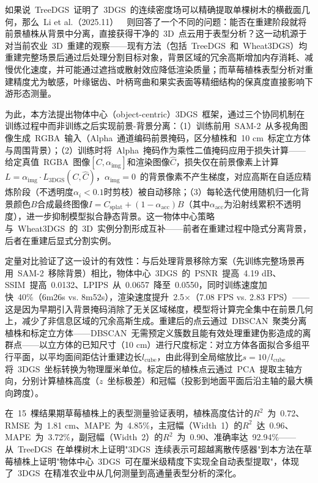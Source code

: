 如果说~TreeDGS~证明了~3DGS~的连续密度场可以精确提取单棵树木的横截面几何，那么~Li et al.（2025.11）~\cite{2511_02207}~则回答了一个不同的问题：能否在重建阶段就将前景植株从背景中分离，直接获得干净的~3D~点云用于表型分析？这一动机源于对当前农业~3D~重建的观察——现有方法（包括~TreeDGS~和~Wheat3DGS）均重建完整场景后通过后处理分割目标对象，背景区域的冗余高斯增加内存消耗、减慢优化速度，并可能通过遮挡或散射效应降低渲染质量；而草莓植株表型分析对重建精度尤为敏感，叶缘锯齿、叶柄弯曲和果实表面等精细结构的保真度直接影响下游形态测量。

为此，本方法提出物体中心（object-centric）3DGS~框架，通过三个协同机制在训练过程中而非训练之后实现前景-背景分离：（1）训练前用~SAM-2~从多视角图像生成~RGBA~输入（Alpha~通道编码前景掩码，区分植株和~10 cm~标定立方体与周围背景）；（2）训练时将~Alpha~掩码作为乘性二值掩码应用于损失计算——给定真值~RGBA~图像$[C, \alpha_{\text{img}}]$和渲染图像$\hat{C}$，损失仅在前景像素上计算$L = \alpha_{\text{img}} \cdot L_{\text{3DGS}}(C, \hat{C})$，$\alpha_{\text{img}} = 0$~的背景像素不产生梯度，对应高斯在自适应精炼阶段（不透明度$\alpha_i < 0.1$时剪枝）被自动移除；（3）每轮迭代使用随机归一化背景颜色$B$合成最终图像$I = C_{\text{splat}} + (1 - \alpha_{\text{acc}})B$（其中$\alpha_{\text{acc}}$为沿射线累积不透明度），进一步抑制模型拟合静态背景。这一物体中心策略与~Wheat3DGS~的~3D~实例分割形成互补——前者在重建过程中隐式分离背景，后者在重建后显式分割实例。

定量对比验证了这一设计的有效性：与后处理背景移除方案（先训练完整场景再用~SAM-2~移除背景）相比，物体中心~3DGS~的~PSNR~提高~4.19 dB、SSIM~提高~0.0132、LPIPS~从~0.0657~降至~0.0550，同时训练速度加快~40\%（6m26s vs. 8m52s），渲染速度提升~2.5$\times$（7.08 FPS vs. 2.83 FPS）——这是因为早期引入背景掩码消除了无关区域梯度，模型将计算完全集中在前景几何上，减少了非信息区域的冗余高斯生成。重建后的点云通过~DBSCAN~聚类分离植株和标定立方体——DBSCAN~无需预定义簇数且能有效处理重建伪影造成的离群点——以立方体的已知尺寸（10 cm）进行尺度标定：对立方体各面拟合多组平行平面，以平均面间距估计重建边长$l_{\text{cube}}$，由此得到全局缩放比$s = 10/l_{\text{cube}}$将~3DGS~坐标转换为物理厘米单位。标定后的植株点云通过~PCA~提取主轴方向，分别计算植株高度（$z$~坐标极差）和冠幅（投影到地面平面后沿主轴的最大横向跨度）。

在~15~棵结果期草莓植株上的表型测量验证表明，植株高度估计的$R^2$~为~0.72、RMSE~为~1.81 cm、MAPE~为~4.85\%，主冠幅（Width~1）的$R^2$~达~0.96、MAPE~为~3.72\%，副冠幅（Width~2）的$R^2$~为~0.90、准确率达~92.94\%——从~TreeDGS~在单棵树木上证明"3DGS~连续表示可超越离散传感器"到本方法在草莓植株上证明"物体中心~3DGS~可在厘米级精度下实现全自动表型提取"，体现了~3DGS~在精准农业中从几何测量到高通量表型分析的深化。

